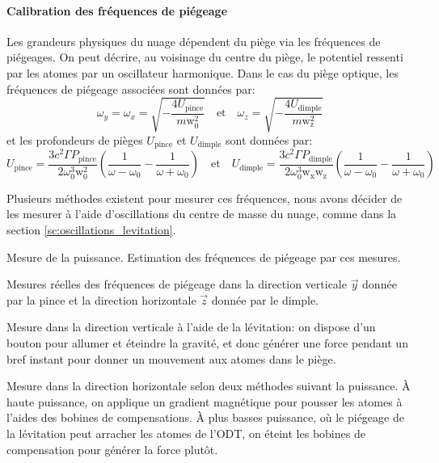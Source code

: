 \paragraph*{Calibration des fréquences de piégeage}
Les grandeurs physiques du nuage dépendent du piège via les fréquences de piégeages. On peut décrire, au voisinage du centre du piège, le potentiel ressenti par les atomes par un oscillateur harmonique. Dans le cas du piège optique, les fréquences de piégeage associées sont données par:
\begin{equation}
\omega_y=\omega_x=\sqrt{-\frac{4 U_{\mathrm{pince}}}{m \mathrm{w}_0^2}} \quad \text{et} \quad \omega_z=\sqrt{-\frac{4U_{\mathrm{dimple}}}{m \mathrm{w}_{\mathrm{z}}^2}}
\end{equation}
et les profondeurs de pièges $U_{\mathrm{pince}}$ et $U_{\mathrm{dimple}}$ sont données par:
\begin{equation}
U_{\mathrm{pince}}= \frac{3c^2 \Gamma P_{\mathrm{pince}}}{2\omega_0^3\mathrm{w}_0^2} \left( \frac{1}{\omega-\omega_0}- \frac{1}{\omega+\omega_0}\right) \quad \text{et} \quad U_{\mathrm{dimple}}=\frac{3c^2 \Gamma P_{\mathrm{dimple}}}{2 \omega_0^3 \mathrm{w}_{\mathrm{x}} \mathrm{w}_{\mathrm{z}}}  \left( \frac{1}{\omega - \omega_0} - \frac{1}{\omega+ \omega_0} \right)
\end{equation}

Plusieurs méthodes existent pour mesurer ces fréquences, nous avons décider de les mesurer à l'aide d'oscillations du centre de masse du nuage, comme dans la section \ref{sc:oscillations_levitation}.

Mesure de la puissance. Estimation des fréquences de piégeage par ces mesures.

Mesures réelles des fréquences de piégeage dans la direction verticale $\vec{y}$ donnée par la pince et la direction horizontale $\vec{z}$ donnée par le dimple.

Mesure dans la direction verticale à l'aide de la lévitation: on dispose d'un bouton pour allumer et éteindre la gravité, et donc générer une force pendant un bref instant pour donner un mouvement aux atomes dans le piège.

Mesure dans la direction horizontale selon deux méthodes suivant la puissance. À haute puissance, on applique un gradient magnétique pour pousser les atomes à l'aides des bobines de compensations. À plus basses puissance, où le piégeage de la lévitation peut arracher les atomes de l'ODT, on éteint les bobines de compensation pour générer la force plutôt. 

